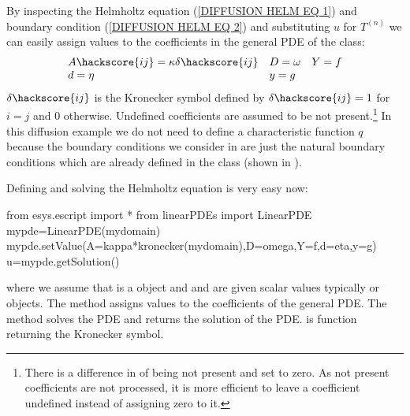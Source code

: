 By inspecting the Helmholtz equation  
(\ref{DIFFUSION HELM EQ 1}) and boundary condition (\ref{DIFFUSION HELM EQ 2}) and 
substituting $u$ for $T^{(n)}$ 
we can easily assign values to the coefficients in the 
general PDE of the \LinearPDE class:
\begin{equation}\label{DIFFUSION HELM EQ 3}
\begin{array}{llllll}
A\hackscore{ij}=\kappa \delta\hackscore{ij} & D=\omega & Y=f \\
d=\eta & y= g &  \\
\end{array}
\end{equation}
$\delta\hackscore{ij}$ is the Kronecker symbol  defined by $\delta\hackscore{ij}=1$ for
$i=j$ and $0$ otherwise. Undefined coefficients are assumed to be not present.\footnote{There is a difference 
in \escript of being not present and set to zero. As not present coefficients are not processed, 
it is more efficient to leave a coefficient undefined instead of assigning zero to it.} 
In this diffusion example we do not need to define a characteristic function $q$ because the 
boundary conditions we consider in  are just the natural boundary 
conditions which are already defined in the \LinearPDE class (shown in ).

Defining and solving the Helmholtz equation is very easy now:
\begin{python}
from esys.escript import *
from linearPDEs import LinearPDE
mypde=LinearPDE(mydomain)
mypde.setValue(A=kappa*kronecker(mydomain),D=omega,Y=f,d=eta,y=g)
u=mypde.getSolution()
\end{python}
where we assume that  is a \Domain object and 
   and  are given scalar values 
typically  or \Data objects. The  method 
assigns values to the coefficients of the general PDE. The  method solves 
the PDE and returns the solution  of the PDE.  is \escript function
returning the Kronecker symbol.

